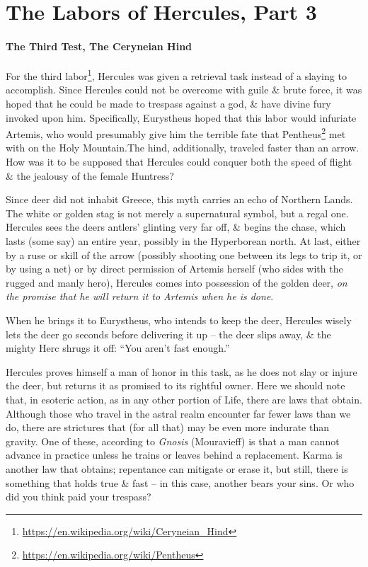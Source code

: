 \section{The Labors of Hercules, Part 3}

\paragraph{The Third Test, The Ceryneian Hind}

For the third labor\footnote{\url{https://en.wikipedia.org/wiki/Ceryneian\_Hind}}, Hercules was given a retrieval task instead of a slaying to accomplish. Since Hercules could not be overcome with guile
\& brute force, it was hoped that he could be made to trespass against a god, \& have divine fury invoked upon him. Specifically, Eurystheus hoped that this labor would infuriate Artemis, who would presumably give him the terrible fate that Pentheus\footnote{\url{https://en.wikipedia.org/wiki/Pentheus}} met with on the Holy Mountain.The hind, additionally, traveled faster than an arrow. How was it to be supposed that Hercules could conquer both the speed of flight \& the jealousy of the female Huntress?

Since deer did not inhabit Greece, this myth carries an echo of Northern Lands. The white or golden stag is not merely a supernatural symbol, but a regal one. Hercules sees the deers antlers' glinting very far off, \& begins the chase, which lasts (some say) an entire year, possibly in the Hyperborean north. At last, either by a ruse or skill of the arrow (possibly shooting one between its legs to trip it, or by using a net) or by direct permission of Artemis herself (who sides with the rugged and manly hero), Hercules comes into possession of the golden deer, \emph{on the promise that he will return it to Artemis when he is done}.

When he brings it to Eurystheus, who intends to keep the deer, Hercules wisely lets the deer go seconds before delivering it up -- the deer slips away, \& the mighty Herc shrugs it off: ``You aren't fast enough.''

Hercules proves himself a man of honor in this task, as he does not slay or injure the deer, but returns it as promised to its rightful owner. Here we should note that, in esoteric action, as in any other portion of Life, there are laws that obtain. Although those who travel in the astral realm encounter far fewer laws than we do, there are strictures that (for all that) may be even more indurate than gravity. One of these, according to \emph{Gnosis} (Mouravieff) is that a man cannot advance in practice unless he trains or leaves behind a replacement. Karma is another law that obtains; repentance can mitigate or erase it, but still, there is something that holds true \& fast -- in this case, another bears your sins. Or who did you think paid your trespass?

